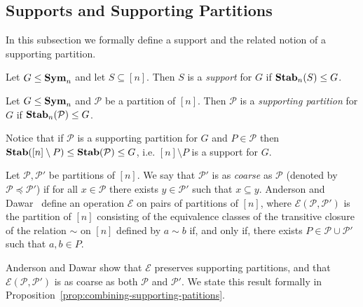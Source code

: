 \documentclass[../paper.tex]{subfiles}
\begin{document}

\subsection{Supports and Supporting Partitions}
In this subsection we formally define a support and the related notion of a
supporting partition.

\begin{definition}
  Let $G \leq \text{\textbf{Sym}}_n$ and let $S \subseteq [n]$. Then $S$ is a \emph{support}
  for $G$ if $\text{\textbf{Stab}}_n(S) \leq G$.
\end{definition}

\begin{definition}
  Let $G \leq \text{\textbf{Sym}}_n$ and $\mathcal{P}$ be a partition of $[n]$. Then
  $\mathcal{P}$ is a \emph{supporting partition} for $G$ if
  $\text{\textbf{Stab}}_n(\mathcal{P}) \leq G$.
\end{definition}

Notice that if $\mathcal{P}$ is a supporting partition for $G$ and $P \in
\mathcal{P}$ then $\text{\textbf{Stab}}([n] \setminus P) \leq \text{\textbf{Stab}}(\mathcal{P}) \leq G$, i.e.
$[n] \setminus P$ is a support for $G$.

Let $\mathcal{P}, \mathcal{P}'$ be partitions of $[n]$. We say that
$\mathcal{P}'$ is as \emph{coarse} as $\mathcal{P}$ (denoted by $\mathcal{P}
\preceq \mathcal{P}'$) if for all $x \in \mathcal{P}$ there exists $y \in
\mathcal{P}'$ such that $x \subseteq y$. Anderson and Dawar~\cite{AndersonD17}
define an operation $\mathcal{E}$ on pairs of partitions of $[n]$, where
$\mathcal{E} (\mathcal{P}, \mathcal{P}')$ is the partition of $[n]$ consisting
of the equivalence classes of the transitive closure of the relation $\sim$ on
$[n]$ defined by $a \sim b$ if, and only if, there exists $P \in \mathcal{P}
\cup \mathcal{P}'$ such that $a,b \in P$.

Anderson and Dawar show that $\mathcal{E}$ preserves supporting partitions, and
that $\mathcal{E}(\mathcal{P}, \mathcal{P}')$ is as coarse as both $\mathcal{P}$
and $\mathcal{P}'$. We state this result formally in
Proposition~\ref{prop:combining-supporting-patitions}.
\end{document}
